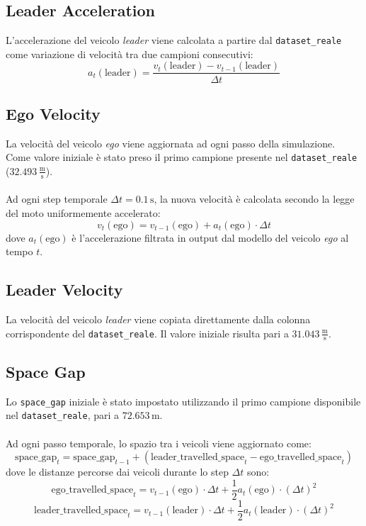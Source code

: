 \subsection{Leader Acceleration}
L'accelerazione del veicolo \emph{leader} viene calcolata a partire dal \texttt{dataset\_reale} come 
variazione di velocità tra due campioni consecutivi:
\[
a_t(\mathrm{leader}) = \frac{v_t(\mathrm{leader}) - v_{t-1}(\mathrm{leader})}{\Delta t}
\]

\subsection{Ego Velocity}
La velocità del veicolo \emph{ego} viene aggiornata ad ogni passo della simulazione.
Come valore iniziale è stato preso il primo campione presente nel \texttt{dataset\_reale} ($32.493 \, \frac{\mathrm{m}}{\mathrm{s}}$).  
\\\\
\noindent Ad ogni step temporale $\Delta t = 0.1\,\mathrm{s}$, la nuova velocità è calcolata secondo la legge del moto uniformemente 
accelerato:
\[
v_t(\mathrm{ego}) = v_{t-1}(\mathrm{ego}) + a_t(\mathrm{ego}) \cdot \Delta t
\]
dove $a_t(\mathrm{ego})$ è l'accelerazione filtrata in output dal modello del veicolo \emph{ego} al tempo $t$.

\subsection{Leader Velocity}
La velocità del veicolo \emph{leader} viene copiata direttamente dalla colonna corrispondente del \texttt{dataset\_reale}.
Il valore iniziale risulta pari a $31.043 \, \frac{\mathrm{m}}{\mathrm{s}}$.

\subsection{Space Gap}
Lo \texttt{space\_gap} iniziale è stato impostato utilizzando il primo campione disponibile nel \texttt{dataset\_reale}, 
pari a $72.653 \, \mathrm{m}$.
\\\\
\noindent Ad ogni passo temporale, lo spazio tra i veicoli viene aggiornato come:
\[
\mathrm{space\_gap}_t = \mathrm{space\_gap}_{t-1} + \left( \mathrm{leader\_travelled\_space}_t - \mathrm{ego\_travelled\_space}_t \right)
\]
dove le distanze percorse dai veicoli durante lo step $\Delta t$ sono:
\[
\mathrm{ego\_travelled\_space}_t = v_{t-1}(\mathrm{ego}) \cdot \Delta t + \frac{1}{2} a_t(\mathrm{ego}) \cdot (\Delta t)^2
\]
\[
\mathrm{leader\_travelled\_space}_t = v_{t-1}(\mathrm{leader}) \cdot \Delta t + \frac{1}{2} a_t(\mathrm{leader}) \cdot (\Delta t)^2
\]

